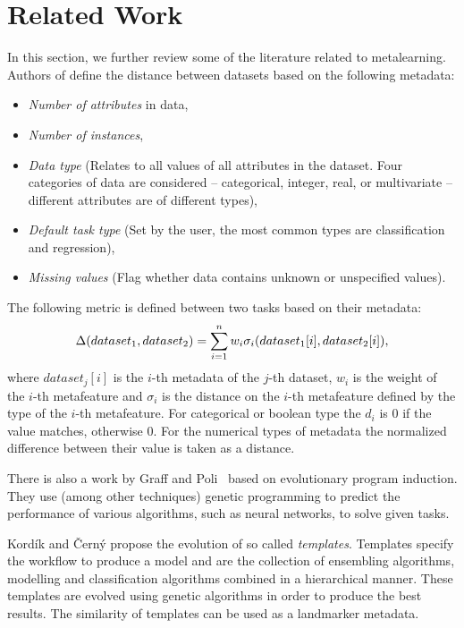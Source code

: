 \section{Related Work}
In this section, we further review some of the literature related to metalearning. Authors of \cite{KazikPesk} define the distance between datasets based on the following metadata:
\begin{itemize}
	\renewcommand{\labelitemi}{$\bullet$}
	\item \textit{Number of attributes} in data,
	\item \textit{Number of instances},
	\item \textit{Data type} (Relates to all values of all attributes in the dataset. Four categories of data are considered -- categorical, integer, real, or multivariate -- different attributes are of different types),
	\item \textit{Default task type} (Set by the user, the most common types are classification and regression),
	\item \textit{Missing values} (Flag whether data contains unknown or unspecified values).
	\end{itemize}
	The following metric is defined between two tasks based on their metadata:
	\begin{equation}
	\Delta(dataset_1,dataset_2) = \sum_{i=1}^{n}w_i\sigma_i(dataset_1[i], dataset_2[i]),
	\end{equation}
	where $dataset_j[i]$ is the $i$-th metadata of the $j$-th dataset, $w_i$ is the weight of the $i$-th metafeature and $\sigma_i$ is the distance on the $i$-th metafeature defined by the type of the $i$-th metafeature. For categorical or boolean type the $d_i$ is 0 if the value matches, otherwise 0. For the numerical types of metadata the normalized difference between their value is taken as a distance.
	
	There is also a work by Graff and Poli~\cite{PoliPerformanceModels} based
	on evolutionary program induction. They use (among other techniques) genetic
	programming to predict the performance of various algorithms, such as neural networks,
	to solve given tasks. 
	
	Kordík and Černý \cite{kordikMetalearningTemplates} propose the evolution of so called \emph{templates}. Templates specify the workflow to produce a model and are the collection of ensembling algorithms, modelling and classification algorithms combined in a hierarchical manner. These templates are evolved using genetic algorithms in order to produce the best results. The similarity of templates can be used as a landmarker metadata.	
	
